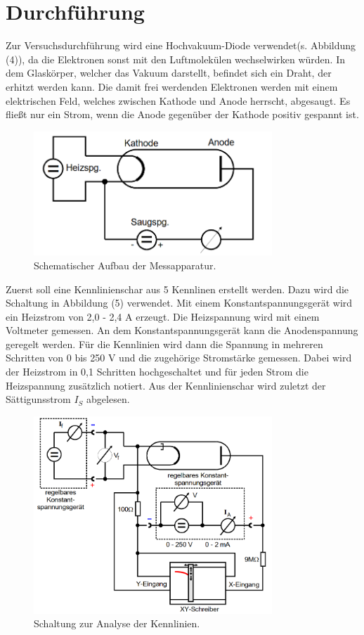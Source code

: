 \section{Durchführung}
\label{sec:Durchführung}

Zur Versuchsdurchführung wird eine Hochvakuum-Diode verwendet(s. Abbildung (4)), da die Elektronen sonst mit den Luftmolekülen wechselwirken würden.
In dem Glaskörper, welcher das Vakuum darstellt, befindet sich ein Draht, der erhitzt werden kann. Die damit frei werdenden Elektronen werden mit einem elektrischen Feld, welches zwischen Kathode und Anode herrscht, abgesaugt.
Es fließt nur ein Strom, wenn die Anode gegenüber der Kathode positiv gespannt ist.
\begin{figure}[H]
  \centering
  \includegraphics[width=0.8\textwidth]{aufbau.png}
  \caption{Schematischer Aufbau der Messapparatur\cite{kent}.}
  \label{fig:aufbau}
\end{figure}
\noindent Zuerst soll eine Kennlinienschar aus 5 Kennlinen erstellt werden. Dazu wird die Schaltung in Abbildung (5) verwendet. Mit einem Konstantspannungsgerät wird ein Heizstrom von 2,0 - 2,4 $\si{\ampere}$ erzeugt. Die Heizspannung wird mit einem Voltmeter gemessen. An dem Konstantspannungsgerät kann die Anodenspannung geregelt werden.
Für die Kennlinien wird dann die Spannung in mehreren Schritten von 0 bis 250 $\si{\volt}$ und die zugehörige Stromstärke gemessen. Dabei wird der Heizstrom in 0,1 Schritten hochgeschaltet und für jeden Strom die Heizspannung zusätzlich notiert.
Aus der Kennlinienschar wird zuletzt der Sättigunsstrom $I_S$ abgelesen.
\begin{figure}[H]
  \centering
  \includegraphics[width=0.8\textwidth]{1.png}
  \caption{Schaltung zur Analyse der Kennlinien\cite{kent}.}
  \label{fig:aufbau}
\end{figure}
